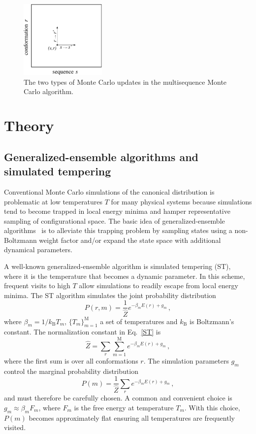 \documentclass[
aip,
rsi,%
amsmath,amssymb,
reprint,%
]{revtex4-1}
\newcommand	 {\rbar}	{{r}}
\begin{document}
\begin{figure}
\includegraphics[width=4.2cm]{./Fig1}
\caption{The two types of Monte Carlo updates in the multisequence Monte Carlo algorithm.}
\end{figure}

\section{Theory}

\subsection{Generalized-ensemble algorithms and simulated tempering}

Conventional Monte Carlo simulations of the canonical distribution is problematic at low temperatures $T$ for many physical systems because simulations tend to become trapped in local energy minima and hamper representative sampling of configurational space. The basic idea of generalized-ensemble algorithms~\cite{Mitsutake2001} is to alleviate this trapping problem by sampling states using a non-Boltzmann weight factor and/or expand the state space with additional dynamical parameters. 

A well-known generalized-ensemble algorithm is simulated tempering (ST),~\cite{Marinari1992,Lyubartsev1992} where it is the temperature that becomes a dynamic parameter. In this scheme, frequent visits to high $T$ allow simulations to readily escape from local energy minima. The ST algorithm simulates the joint probability distribution 
\begin{equation}
P(\rbar,m) =\dfrac{1}{\hat{Z}} e^{-\beta_m E(\rbar) + g_m}\,,
\label{ST}
\end{equation}
where  $\beta_m=1/k_\mathrm{B} T_m$, $\{T_m\}_{m=1}^\mathrm{M}$ a set of temperatures and $k_\mathrm{B}$ is Boltzmann's constant. The normalization constant in Eq.~\ref{ST} is  
\begin{equation}
\hat{Z} = \sum_r \sum_{m=1}^{\mathrm{M}}e^{-\beta_m E(\rbar) + g_m}\,,
\end{equation}
where the first sum is over all conformations $\rbar$. The simulation parameters $g_m$ control the marginal probability distribution
\begin{equation}
P(m) = \frac{1}{\hat{Z}}\sum_r e^{-\beta_m E(\rbar) + g_m} \,,
\end{equation}
and must therefore be carefully chosen. A common and convenient choice is $g_m\approx \beta_m F_m$, where $F_m$ is the free energy at temperature $T_m$. With this choice, $P(m)$ becomes approximately flat ensuring all temperatures are frequently visited. 
\end{document}
